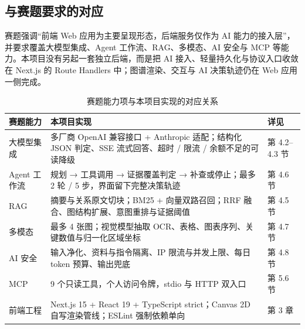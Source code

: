 \subsection{与赛题要求的对应}

赛题强调“前端 Web 应用为主要呈现形态，后端服务仅作为 AI 能力的接入层”，并要求覆盖大模型集成、Agent 工作流、RAG、多模态、AI 安全与 MCP 等能力。本项目没有另起一套独立后端，而是把 AI 接入、轻量持久化与协议入口收敛在 Next.js 的 Route Handlers 中；图谱渲染、交互与 AI 决策轨迹仍在 Web 应用一侧完成。

\begin{table}[H]
  \centering
  \scriptsize
  \caption{赛题能力项与本项目实现的对应关系}
  \label{tab:contest}
  \begin{tabularx}{\textwidth}{L{3.4cm}L{7.2cm}L{2.4cm}}
    \toprule
\textbf{赛题能力} & \textbf{本项目实现} & \textbf{详见} \\
    \midrule
    大模型集成 & 多厂商 OpenAI 兼容接口 + Anthropic 适配；结构化 JSON 判定、SSE 流式回答、超时 / 限流 / 余额不足的可读降级 & 第 4.2--4.3 节 \\
    Agent 工作流 & 规划 → 工具调用 → 证据覆盖判定 → 补查或停止；最多 2 轮 / 5 步，界面留下完整决策轨迹 & 第 4.6 节 \\
    RAG & 摘要与关系原文切块；BM25 + 向量双路召回；RRF 融合、图结构扩展、意图重排与证据阈值 & 第 4.5 节 \\
    多模态 & 最多 4 张图；视觉模型抽取 OCR、表格、图表序列、关键数值与归一化区域坐标 & 第 4.7 节 \\
    AI 安全 & 输入净化、资料与指令隔离、IP 限流与并发上限、每日 token 预算、输出兜底 & 第 4.8 节 \\
    MCP & 9 个只读工具，个人访问令牌，stdio 与 HTTP 双入口 & 第 5.6 节 \\
    前端工程 & Next.js 15 + React 19 + TypeScript strict；Canvas 2D 自写渲染管线；ESLint 强制依赖单向 & 第 3 章 \\
    \bottomrule
  \end{tabularx}
\end{table}
